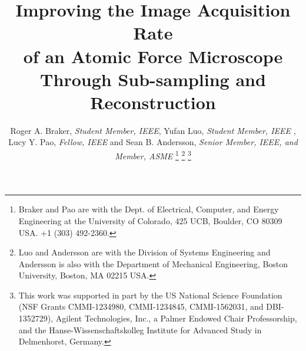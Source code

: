\documentclass[journal]{IEEEtran}
\begin{document}
\title{Improving the Image Acquisition Rate \\ of an Atomic Force Microscope \\
Through Sub-sampling and Reconstruction}

\author{Roger A. Braker, \textit{Student Member, IEEE}, Yufan Luo, \textit{Student Member, IEEE} , Lucy Y. Pao, \textit{Fellow, IEEE} and Sean B. Andersson, \textit{Senior Member, IEEE, and Member, ASME}
  \thanks{Braker and Pao are with the Dept. of Electrical, Computer, and
    Energy Engineering at the University of Colorado, 425 UCB,
    Boulder, CO 80309 USA. %
    +1 (303) 492-2360.} 
    \thanks{Luo and Andersson are with the Division of Systems Engineering and Andersson is also with the Department of Mechanical Engineering, Boston University, Boston, MA 02215 USA.}
  \thanks{This work was supported in part by the US National Science
    Foundation (NSF Grants CMMI-1234980, CMMI-1234845, CMMI-1562031, and DBI-1352729), Agilent Technologies,
    Inc., a Palmer Endowed Chair Professorship, and the Hanse-Wissenschaftskolleg Institute for Advanced Study in Delmenhorst, Germany.} }
\end{document}
